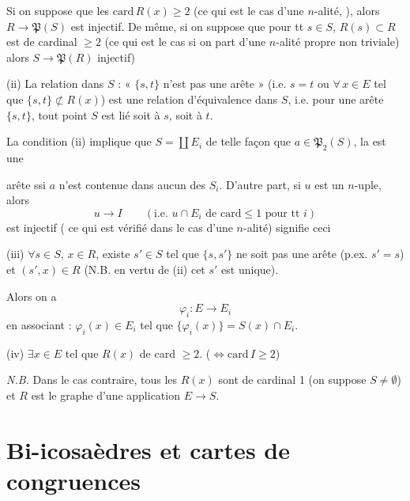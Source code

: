 \documentclass[11pt,a4paper]{article}
\begin{document}
Si on suppose que les  $\mathrm{card}\,R(x)\geq 2$ \struck{\ill{}} (ce qui est le cas   d'une \struck{\ill{}} $n$-alité, ), alors $R\to\mathfrak P(S)$ est injectif. De même, si on suppose que pour tt $s\in S$, $R(s)\subset R$ est de cardinal $\geq 2$ (ce qui est le cas si on part d'une $n$-alité propre non triviale) alors $S\to\mathfrak P(R)$ injectif)

(ii) La relation dans $S$ : « $\{s,t\}$ n'est pas une arête » (i.e. $s=t$ ou \struck{$\nexists$} $\forall\, x\in E$ tel que $\{s,t\}\not\subset R(x)$) est une relation d'équivalence dans $S$, i.e. pour une \struck{\ill{}} arête $\{s,t\}$, tout point  $S$ est lié soit à $s$, soit à $t$.

 La condition (ii) implique que $S = \coprod E_i$ de telle façon que  $a\in\mathfrak P_2(S)$, la est une

arête ssi $a$ n'est contenue dans aucun des $S_i$. D'autre part, si $u$  est un $n$-uple, alors
\[
u \longrightarrow I \qquad (\text{i.e. } u\cap E_i \text{ de card} \leq 1 \text{ pour tt } i)
\]
est injectif ( ce qui est vérifié dans le cas d'une $n$-alité) signifie ceci

(iii) $\forall s\in S$, $x\in R$, existe $s'\in S$ tel que $\{s,s'\}$ ne soit pas une arête (p.ex. $s'=s$) et $(s',x)\in R$ (N.B. en vertu de (ii) cet $s'$ est unique).

Alors on a
\[
\varphi_i : E \longrightarrow E_i
\]
en associant :   $\varphi_i(x)\in E_i$ tel que $\{\varphi_i(x)\} = S(x)\cap E_i$.

(iv) \struck{\ill{}} $\exists x\in E$ tel que $R(x)$ de card $\geq 2$. ($\Longleftrightarrow \mathrm{card}\,I\geq 2$)

\emph{N.B.} Dans le cas contraire, tous les $R(x)$ sont de cardinal 1 (on suppose $S\neq\emptyset$) et $R$ est le graphe d'une application $E\to S$.

\section{Bi-icosaèdres et cartes de congruences}
\end{document}
